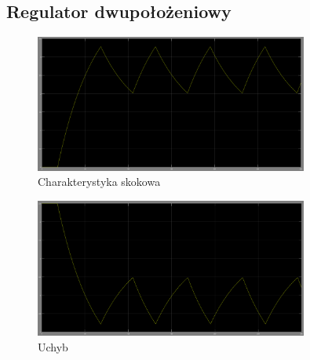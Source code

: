 \documentclass[a4paper]{article}
\begin{document}
		\subsection{Regulator dwupołożeniowy}
			\begin{figure}[H]
				\centering
				\caption{Charakterystyka skokowa}
				\includegraphics[width=0.8\textwidth]{./img/dwapol_step.png}
			\end{figure}
			\begin{figure}[H]
				\centering
				\caption{Uchyb}
				\includegraphics[width=0.8\textwidth]{./img/dwapol_error.png}
			\end{figure}
\end{document}
